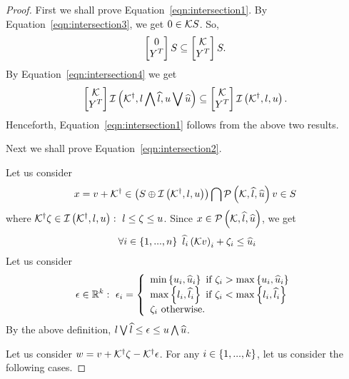 \begin{proof}

First we shall prove Equation~\ref{eqn:intersection1}.
By Equation~\ref{eqn:intersection3}, we get $0\in\mathcal{K} S$.  So,
%
\[
\left[\begin{matrix}0\\ Y^T\end{matrix}\right]S\subseteq\left[\begin{matrix}\mathcal{K}\\ Y^T\end{matrix}\right]S.
\]
%
By
Equation~\ref{eqn:intersection4} we get
\[
\left[\begin{matrix}\mathcal{K}\\Y^T\end{matrix}\right]\mathit{\operatorname{\mathcal{I}}}\left({\mathcal{K}}^\dagger,l\bigwedge \widehat{l},u\bigvee \widehat{u}\right)\subseteq\left[\begin{matrix}\mathcal{K}\\Y^T\end{matrix}\right]\mathit{\operatorname{\mathcal{I}}}\left({\mathcal{K}}^\dagger,l,u\right).
\]
%
Henceforth, Equation~\ref{eqn:intersection1} follows from the above two results.

Next we shall prove Equation~\ref{eqn:intersection2}.

Let us consider
\[
x=v+{\mathcal{K}}^\dagger\in \left(S\oplus \mathit{\operatorname{\mathcal{I}}}\left({\mathcal{K}}^\dagger,l,u\right)\right)\bigcap\mathcal{P}\left(\mathcal{K},\widehat{l},\widehat{u}\right)v\in
S
\]
%
where
${\mathcal{K}}^\dagger\zeta\in \mathit{\operatorname{\mathcal{I}}}\left({\mathcal{K}}^\dagger,l,u\right):~l\leq\zeta\leq u$.  Since
$x\in\mathcal{P}\left(\mathcal{K},\widehat{l},\widehat{u}\right)$, we get
%
\begin{equation}~\label{proof-intersection1}
\forall i\in\left\{1,...,n\right\}~\widehat{l}_i\left(\mathcal{K} v\right)_i+\zeta_i\leq\widehat{u}_i
\end{equation}
%
Let us consider
\begin{align*}
& \epsilon\in\mathbb{R}^k:~\epsilon_i=\left\{\begin{array}{l}
\min\left\{u_i,\widehat{u}_i\right\}~\text{if}~\zeta_i>\max\left\{u_i,\widehat{u}_i\right\}\\
\max\left\{l_i,\widehat{l}_i\right\}~\text{if}~\zeta_i<\max\left\{l_i,\widehat{l}_i\right\}\\
\zeta_i~\text{otherwise}.
\end{array}
\right.\\
\end{align*}
%
By the above definition,
$l\bigvee \widehat{l}\leq \epsilon\leq u\bigwedge \widehat{u}$.  

Let us consider $w=v+{\mathcal{K}}^\dagger\zeta-{\mathcal{K}}^\dagger\epsilon$.   For
any $i\in \left\{1,...,k\right\}$, let us consider the following cases.


\end{proof}

